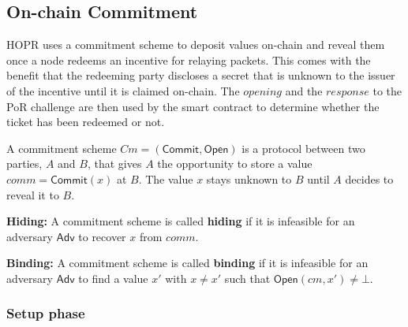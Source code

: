\subsection{On-chain Commitment}

HOPR uses a commitment scheme to deposit values on-chain and reveal them once a node redeems an incentive for relaying packets. This comes with the benefit that the redeeming party discloses a secret that is unknown to the issuer of the incentive until it is claimed on-chain. The $opening$ and the $response$ to the PoR challenge are then used by the smart contract to determine whether the ticket has been redeemed or not.

\begin{defnsub}
    A commitment scheme $Cm = (\mathsf{Commit}, \mathsf{Open})$ is a protocol between two parties, $A$ and $B$, that gives $A$ the opportunity to store a value $comm = \mathsf{Commit}(x)$ at $B$. The value $x$ stays unknown to $B$ until $A$ decides to reveal it to $B$.

    \noindent\textbf{Hiding:} A commitment scheme is called \textbf{hiding} if it is infeasible for an adversary $\mathsf{Adv}$ to recover $x$ from $comm$.

    \noindent\textbf{Binding:} A commitment scheme is called \textbf{binding} if it is infeasible for an adversary $\mathsf{Adv}$ to find a value $x'$ with $x \neq x'$ such that $\mathsf{Open}(cm, x') \neq \bot$.
\end{defnsub}

\subsubsection{Setup phase}

